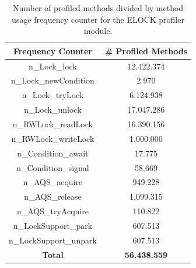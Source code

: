\documentclass[]{usiinfthesis}
\begin{document}
 \begin{table}
\centering
\caption{Number of profiled methods divided by method usage frequency counter for the ELOCK profiler module.}
\begin{tabular}{|c|c|}
\hline
\textbf{Frequency Counter} & \textbf{# Profiled Methods} \\
\hline
n\_Lock\_lock	&	 12.422.374 	 \\ 
n\_Lock\_newCondition	&	 2.970 	 \\ 
n\_Lock\_tryLock	&	 6.124.938 	 \\ 
n\_Lock\_unlock	&	 17.047.286 	 \\ 
n\_RWLock\_readLock	&	 16.390.156 	 \\ 
n\_RWLock\_writeLock	&	 1.000.000 	 \\ 
n\_Condition\_await	&	 17.775 	 \\ 
n\_Condition\_signal	&	 58.669 	 \\ 
n\_AQS\_acquire	&	 949.228 	 \\ 
n\_AQS\_release	&	 1.099.315 	 \\ 
n\_AQS\_tryAcquire	&	 110.822 	 \\ 
n\_LockSupport\_park	&	 607.513 	 \\ 
n\_LockSupport\_unpark	&	 607.513 	 \\ 
\hline			
\hline			
\textbf{Total}	&  \textbf{	 56.438.559 	 }\\ 
\hline			
\end{tabular}
\end{table}%


 
\end{document}
